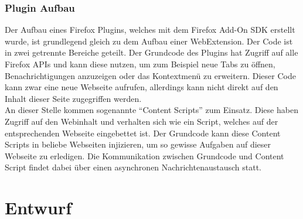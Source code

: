 \subsection{Plugin Aufbau}
\label{sec:FirefoxPluginsAufbau}
Der Aufbau eines Firefox Plugins, welches mit dem Firefox Add-On SDK erstellt wurde, ist grundlegend gleich zu dem Aufbau einer WebExtension. Der Code ist in zwei getrennte Bereiche geteilt. Der Grundcode des Plugins hat Zugriff auf alle Firefox APIs und kann diese nutzen, um zum Beispiel neue Tabs zu öffnen, Benachrichtigungen anzuzeigen oder das Kontextmenü zu erweitern. Dieser Code kann zwar eine neue Webseite aufrufen, allerdings kann nicht direkt auf den Inhalt dieser Seite zugegriffen werden.\\
An dieser Stelle kommen sogenannte \enquote{Content Scripts} zum Einsatz. Diese haben Zugriff auf den Webinhalt und verhalten sich wie ein Script, welches auf der entsprechenden Webseite eingebettet ist. Der Grundcode kann diese Content Scripts in beliebe Webseiten injizieren, um so gewisse Aufgaben auf dieser Webseite zu erledigen. Die Kommunikation zwischen Grundcode und Content Script findet dabei über einen asynchronen Nachrichtenaustausch statt. \cite{ContentScripts}

\chapter{Entwurf}
